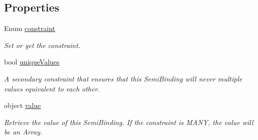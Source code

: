 \subsection*{Properties}
\begin{DoxyCompactItemize}
\item 
\hypertarget{interfacestrange_1_1framework_1_1api_1_1_i_semi_binding_a66062d19019961c4db4449d4b986cbd2}{Enum \hyperlink{interfacestrange_1_1framework_1_1api_1_1_i_semi_binding_a66062d19019961c4db4449d4b986cbd2}{constraint}}\label{interfacestrange_1_1framework_1_1api_1_1_i_semi_binding_a66062d19019961c4db4449d4b986cbd2}

\begin{DoxyCompactList}\small\item\em Set or get the constraint. \end{DoxyCompactList}\item 
\hypertarget{interfacestrange_1_1framework_1_1api_1_1_i_semi_binding_a12a19a998a1eaa1442cc38bd1f5aad79}{bool \hyperlink{interfacestrange_1_1framework_1_1api_1_1_i_semi_binding_a12a19a998a1eaa1442cc38bd1f5aad79}{unique\-Values}}\label{interfacestrange_1_1framework_1_1api_1_1_i_semi_binding_a12a19a998a1eaa1442cc38bd1f5aad79}

\begin{DoxyCompactList}\small\item\em A secondary constraint that ensures that this Semi\-Binding will never multiple values equivalent to each other. \end{DoxyCompactList}\item 
\hypertarget{interfacestrange_1_1framework_1_1api_1_1_i_semi_binding_ac7677f91dc2812c8bf89a523f58c1a09}{object \hyperlink{interfacestrange_1_1framework_1_1api_1_1_i_semi_binding_ac7677f91dc2812c8bf89a523f58c1a09}{value}}\label{interfacestrange_1_1framework_1_1api_1_1_i_semi_binding_ac7677f91dc2812c8bf89a523f58c1a09}

\begin{DoxyCompactList}\small\item\em Retrieve the value of this Semi\-Binding. If the constraint is M\-A\-N\-Y, the value will be an Array. \end{DoxyCompactList}\end{DoxyCompactItemize}


